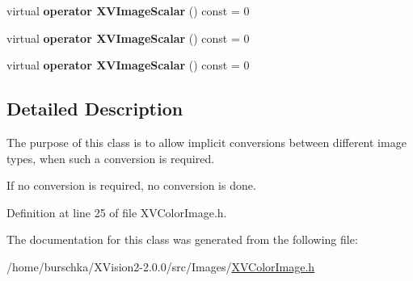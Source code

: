 \begin{CompactItemize}
\item 
\label{XVColorImage_a14}
\hypertarget{class_XVColorImage_a14}{
virtual {\bf operator XVImage\-Scalar} () const = 0}

\item 
\label{XVColorImage_a15}
\hypertarget{class_XVColorImage_a15}{
virtual {\bf operator XVImage\-Scalar} () const = 0}

\item 
\label{XVColorImage_a16}
\hypertarget{class_XVColorImage_a16}{
virtual {\bf operator XVImage\-Scalar} () const = 0}

\end{CompactItemize}


\subsection{Detailed Description}
The purpose of this class is to allow implicit conversions between different image types, when such a conversion is required.

If no conversion is required, no conversion is done. 



Definition at line 25 of file XVColor\-Image.h.

The documentation for this class was generated from the following file:\begin{CompactItemize}
\item 
/home/burschka/XVision2-2.0.0/src/Images/\hyperlink{XVColorImage.h-source}{XVColor\-Image.h}\end{CompactItemize}
